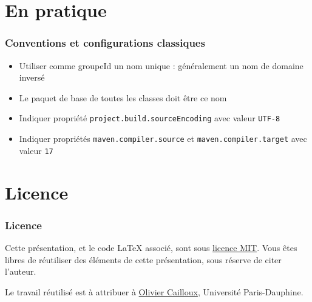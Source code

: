 \documentclass[english, french]{beamer}
\begin{document}
\section{En pratique}
\begin{frame}
	\frametitle{Conventions et configurations classiques}
	\begin{itemize}
		\item Utiliser comme groupeId un nom unique : généralement un nom de domaine inversé
		\item Le paquet de base de toutes les classes doit être ce nom
		\item Indiquer propriété \texttt{project.build.sourceEncoding} avec valeur \texttt{UTF-8}
		\item Indiquer propriétés \texttt{maven.compiler.source} et \texttt{maven.compiler.target} avec valeur \texttt{17}
	\end{itemize}
\end{frame}

\appendix

\section{Licence}
\begin{frame}
	\frametitle{Licence}
	Cette présentation, et le code LaTeX associé, sont sous \href{https://opensource.org/licenses/MIT}{licence MIT}. Vous êtes libres de réutiliser des éléments de cette présentation, sous réserve de citer l’auteur.
	
	Le travail réutilisé est à attribuer à \href{https://www.lamsade.dauphine.fr/~ocailloux/}{Olivier Cailloux}, Université Paris-Dauphine.
\end{frame}
\end{document}
